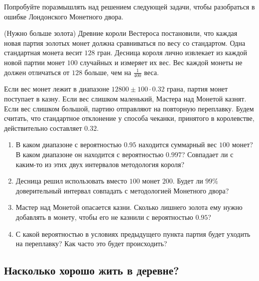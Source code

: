 \documentclass[12pt, a4paper, oneside]{article}
\begin{document}
Попробуйте поразмышлять над решением следующей задачи, чтобы разобраться в ошибке Лондонского Монетного двора. 

\begin{problem}{(Нужно больше золота)}
Древние короли Вестероса постановили, что каждая новая партия золотых монет должна сравниваться по весу со стандартом. Одна стандартная монета весит $128$ гран. Десница короля лично извлекает из каждой новой партии монет $100$ случайных и измеряет их вес. Вес каждой монеты не должен отличаться от $128$ больше, чем на $\frac{1}{400}$ веса.

Если вес монет лежит в диапазоне $12800 \pm 100 \cdot 0.32$ грана, партия монет поступает в казну. Если вес слишком маленький, Мастера над Монетой казнят. Если вес слишком большой, партию отправляют на повторную переплавку. Будем считать, что стандартное отклонение у способа чеканки, принятого в королевстве, действительно составляет $0.32$. 

\begin{enumerate} 
    \item В каком диапазоне с вероятностью $0.95$ находится суммарный вес $100$ монет? В каком диапазоне он находится с вероятностью $0.997$? Совпадает ли с каким-то из этих двух интервалов методология короля?
    
    \item Десница решил использовать вместо $100$ монет $200$. Будет ли $99\%$ доверительный интервал совпадать с методологией Монетного двора? 

    \item Мастер над Монетой опасается казни. Сколько лишнего золота ему нужно добавлять в монету, чтобы его не казнили с вероятностью $0.95$?
    
    \item С какой вероятностью в условиях предыдущего пункта партия будет уходить на переплавку? Как часто это будет происходить? 
\end{enumerate} 
\end{problem}



\subsection{Насколько хорошо жить в деревне?} 
\end{document}
